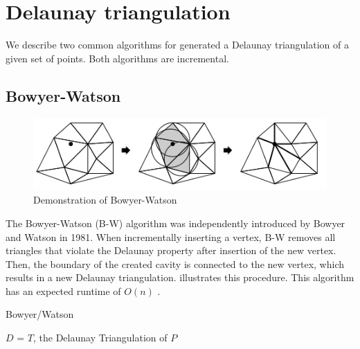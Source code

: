 \section{Delaunay triangulation}
\label{sec:triangulation}

We describe two common algorithms for generated a Delaunay triangulation of a given set of points.
Both algorithms are incremental.

\subsection{Bowyer-Watson}
\label{sub:bowyer_watson}

\begin{figure}
    \includegraphics[width=\columnwidth]{../images/BW.png}
    \caption{Demonstration of Bowyer-Watson}
    \label{fig:BowyerWatsonIllustration}
\end{figure}

The Bowyer-Watson (B-W) algorithm was independently introduced by Bowyer \cite{art:Bowyer1981} and Watson \cite{art:Watson1981} in 1981.
When incrementally inserting a vertex, B-W removes all triangles that violate the Delaunay property after insertion of the new vertex.
Then, the boundary of the created cavity is connected to the new vertex, which results in a new Delaunay triangulation.
 illustrates this procedure.
This algorithm has an expected runtime of $O(n)$ \cite{shewchuk}.

\begin{algorithm}
    \caption{Bowyer/Watson}
    \begin{algorithmic}
            \EndFor
            \Return $D$ = $T$, the Delaunay Triangulation of $P$
        \EndFunction
    \end{algorithmic}
\end{algorithm}

